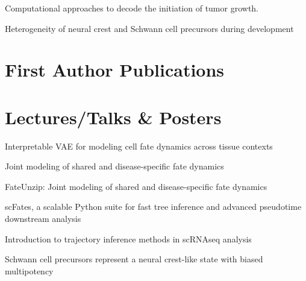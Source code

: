 \documentclass[12pt]{deedy-resume-openfont}
\begin{document}
Computational approaches to decode the initiation of tumor growth.
\sectionsep

Heterogeneity of neural crest and Schwann cell precursors during development

\vspace{6pt}

%
%
\section{First Author Publications}



%
%
\newpage

\section{Lectures/Talks \& Posters}
\vspace{-2pt}
\noindent\begin{minipage}[t]{0.48\textwidth}
Interpretable VAE for modeling cell fate dynamics across tissue contexts 
\sectionsep

Joint modeling of shared and disease-specific fate dynamics 
\sectionsep

FateUnzip: Joint modeling of shared and disease-specific fate dynamics 
\end{minipage}
\hfill
\noindent\begin{minipage}[t]{0.48\textwidth}
scFates, a scalable Python suite for fast tree inference and advanced pseudotime downstream analysis 
\sectionsep

Introduction to trajectory inference methods in scRNAseq analysis 
\sectionsep

Schwann cell precursors represent a neural crest-like state with biased multipotency 
\end{minipage}
\end{document}
